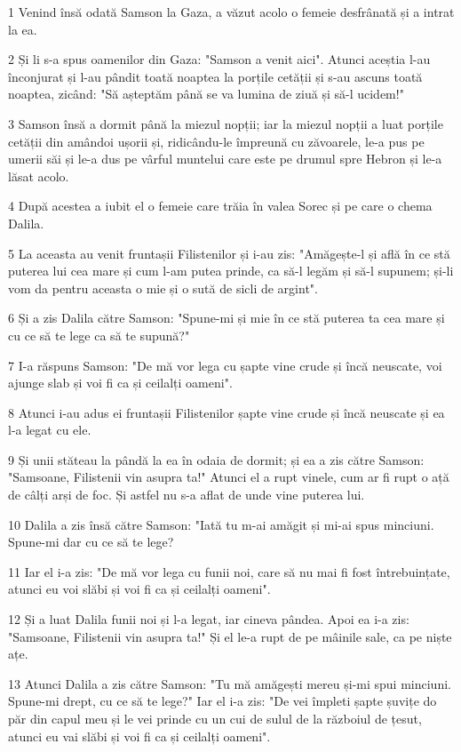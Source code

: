\par 1 Venind însă odată Samson la Gaza, a văzut acolo o femeie desfrânată și a intrat la ea.
\par 2 Și li s-a spus oamenilor din Gaza: "Samson a venit aici". Atunci aceștia l-au înconjurat și l-au pândit toată noaptea la porțile cetății și s-au ascuns toată noaptea, zicând: "Să așteptăm până se va lumina de ziuă și să-l ucidem!"
\par 3 Samson însă a dormit până la miezul nopții; iar la miezul nopții a luat porțile cetății din amândoi ușorii și, ridicându-le împreună cu zăvoarele, le-a pus pe umerii săi și le-a dus pe vârful muntelui care este pe drumul spre Hebron și le-a lăsat acolo.
\par 4 După acestea a iubit el o femeie care trăia în valea Sorec și pe care o chema Dalila.
\par 5 La aceasta au venit fruntașii Filistenilor și i-au zis: "Amăgește-l și află în ce stă puterea lui cea mare și cum l-am putea prinde, ca să-l legăm și să-l supunem; și-li vom da pentru aceasta o mie și o sută de sicli de argint".
\par 6 Și a zis Dalila către Samson: "Spune-mi și mie în ce stă puterea ta cea mare și cu ce să te lege ca să te supună?"
\par 7 I-a răspuns Samson: "De mă vor lega cu șapte vine crude și încă neuscate, voi ajunge slab și voi fi ca și ceilalți oameni".
\par 8 Atunci i-au adus ei fruntașii Filistenilor șapte vine crude și încă neuscate și ea l-a legat cu ele.
\par 9 Și unii stăteau la pândă la ea în odaia de dormit; și ea a zis către Samson: "Samsoane, Filistenii vin asupra ta!" Atunci el a rupt vinele, cum ar fi rupt o ață de câlți arși de foc. Și astfel nu s-a aflat de unde vine puterea lui.
\par 10 Dalila a zis însă către Samson: "Iată tu m-ai amăgit și mi-ai spus minciuni. Spune-mi dar cu ce să te lege?
\par 11 Iar el i-a zis: "De mă vor lega cu funii noi, care să nu mai fi fost întrebuințate, atunci eu voi slăbi și voi fi ca și ceilalți oameni".
\par 12 Și a luat Dalila funii noi și l-a legat, iar cineva pândea. Apoi ea i-a zis: "Samsoane, Filistenii vin asupra ta!" Și el le-a rupt de pe mâinile sale, ca pe niște ațe.
\par 13 Atunci Dalila a zis către Samson: "Tu mă amăgești mereu și-mi spui minciuni. Spune-mi drept, cu ce să te lege?" Iar el i-a zis: "De vei împleti șapte șuvițe do păr din capul meu și le vei prinde cu un cui de sulul de la războiul de țesut, atunci eu vai slăbi și voi fi ca și ceilalți oameni".
